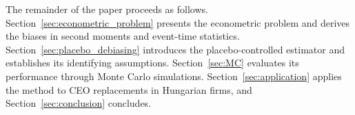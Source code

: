 \documentclass[sigconf,nonacm]{acmart}
\begin{document}
The remainder of the paper proceeds as follows. Section~\ref{sec:econometric_problem}
presents the econometric problem and derives the biases in second moments
and event-time statistics. Section~\ref{sec:placebo_debiasing} introduces
the placebo-controlled estimator and establishes its identifying assumptions.
Section~\ref{sec:MC} evaluates its performance through Monte Carlo
simulations. Section~\ref{sec:application} applies the method to CEO
replacements in Hungarian firms, and Section~\ref{sec:conclusion} concludes.


\end{document}
